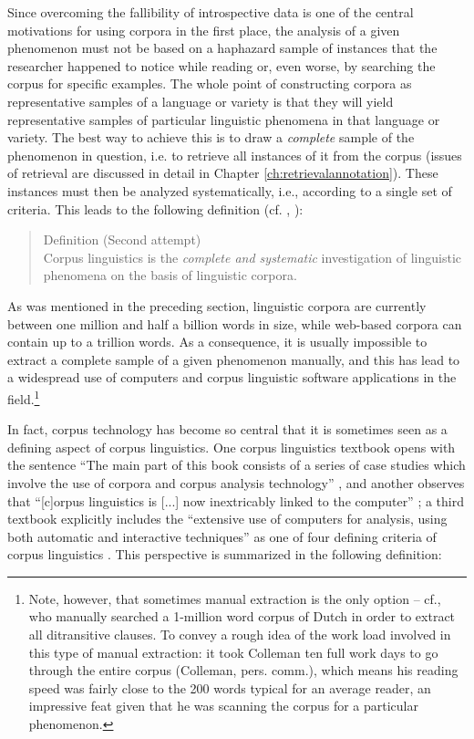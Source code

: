 Since overcoming the fallibility of introspective data is one of the central motivations for using corpora in the first place, the analysis of a given phenomenon must not be based on a haphazard sample of instances that the researcher happened to notice while reading or, even worse, by searching the corpus for specific examples. The whole point of constructing corpora as representative samples of a language or variety is that they will yield representative samples of particular linguistic phenomena in that language or variety. The best way to achieve this is to draw a \emph{complete} sample of the phenomenon in question, i.e. to retrieve all instances of it from the corpus (issues of retrieval are discussed in detail in Chapter \ref{ch:retrievalannotation}). These instances must then be analyzed systematically, i.e., according to a single set of criteria. This leads to the following definition (cf. \citealt[2]{biber_cambridge_2015}, \citealt[78]{cook_applied_2003}):

\begin{samepage}
\begin{quotation}
Definition (Second attempt) \\
Corpus linguistics is the \emph{complete and systematic} investigation of linguistic phenomena on the basis of linguistic corpora.
\end{quotation}
\end{samepage}

As was mentioned in the preceding section, linguistic corpora are currently between one million and half a billion words in size, while web-based corpora can contain up to a trillion words. As a consequence, it is usually impossible to extract a complete sample of a given phenomenon manually, and this has lead to a widespread use of computers and corpus linguistic software applications in the field.\footnote{Note, however, that sometimes manual extraction is the only option -- cf.\citet{colleman_nederlandse_2006,colleman_verb_2009}, who manually searched a 1-million word corpus of Dutch in order to extract all ditransitive clauses. To convey a rough idea of the work load involved in this type of manual extraction: it took Colleman ten full work days to go through the entire corpus (Colleman, pers. comm.), which means his reading speed was fairly close to the 200 words typical for an average reader, an impressive feat given that he was scanning the corpus for a particular phenomenon.} 

In fact, corpus technology has become so central that it is sometimes seen as a defining aspect of corpus linguistics. One corpus linguistics textbook opens with the sentence ``The main part of this book consists of a series of case studies which involve the use of corpora and corpus analysis technology'' \citep[1]{partington_patterns_1998}, and another observes that ``[c]orpus linguistics is [...] now inextricably linked to the computer'' \citep[5]{kennedy_introduction_1998}; a third textbook explicitly includes the ``extensive use of computers for analysis, using both automatic and interactive techniques'' as one of four defining criteria of corpus linguistics \cite[4]{biber_corpus_1998}. This perspective is summarized in the following definition:

